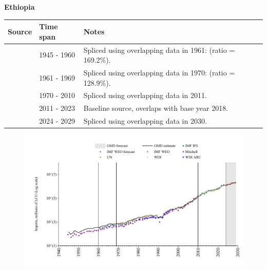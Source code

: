 \documentclass[12pt,a4paper,landscape]{article}
\begin{document}
\begin{adjustbox}{max totalsize={\paperwidth}{\paperheight},center}
\begin{minipage}[t][\textheight][t]{\textwidth}
\vspace*{0.5cm}
{}
\begin{center}
{\Large\bfseries Ethiopia}
\end{center}
\vspace{0.5cm}
\begin{table}[H]
\centering
\small
\begin{tabular}{|l|l|l|}
\hline
\textbf{Source} & \textbf{Time span} & \textbf{Notes} \\
\hline
\rowcolor{white}\cite{Mitchell}& 1945 - 1960 &Spliced using overlapping data in 1961: (ratio = 169.2\%).\\
\rowcolor{lightgray}\cite{IMF_IFS}& 1961 - 1969 &Spliced using overlapping data in 1970: (ratio = 128.9\%).\\
\rowcolor{white}\cite{UN}& 1970 - 2010 &Spliced using overlapping data in 2011.\\
\rowcolor{lightgray}\cite{WDI}& 2011 - 2023 &Baseline source, overlaps with base year 2018.\\
\rowcolor{white}\cite{IMF_WEO_forecast}& 2024 - 2029 &Spliced using overlapping data in 2030.\\
\hline
\end{tabular}
\end{table}
\begin{figure}[H]
\centering
\includegraphics[width=\textwidth,height=0.6\textheight,keepaspectratio]{graphs/ETH_imports.pdf}
\end{figure}
\end{minipage}
\end{adjustbox}
\end{document}
